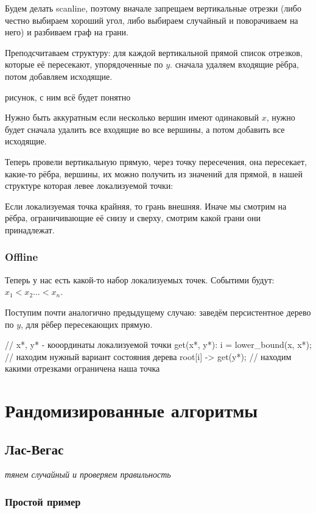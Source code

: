 Будем делать scanline, поэтому вначале запрещаем вертикальные 
отрезки (либо честно выбираем хороший угол, либо выбираем случайный 
и поворачиваем на него) и разбиваем граф на грани.

Преподсчитаваем структуру: для каждой вертикальной прямой список отрезков, которые
её пересекают, упорядоченные по $y$.  сначала удаляем входящие рёбра, потом добавляем
исходящие.

\TODO рисунок, с ним всё будет понятно

Нужно быть аккуратным если несколько вершин имеют одинаковый $x$, нужно будет
сначала удалить все входящие во все вершины, а потом добавить все исходящие.

Теперь провели вертикальную прямую, через точку пересечения, она пересекает,
какие-то рёбра, вершины, их можно получить из значений для прямой,
в нашей структуре которая левее локализуемой точки:

Если локализуемая точка крайняя, то грань внешняя. Иначе мы смотрим на рёбра, 
ограничивающие её снизу и сверху, смотрим какой грани они принадлежат.

\subsection{Offline}

Теперь у нас есть какой-то набор локализуемых точек.
Событими будут: $x_1 < x_2 \ldots < x_n$.

Поступим почти аналогично предыдущему случаю: заведём персистентное дерево по $y$,
для рёбер пересекающих прямую.

\begin{cppcode}
    // x*, y* - кооординаты локализуемой точки
    get(x*, y*):
        i = lower\_bound(x, x*); // находим нужный вариант состояния дерева
        root[i] -> get(y*);      // находим какими отрезками ограничена наша точка
\end{cppcode}


\chapter{Рандомизированные алгоритмы}

\section{Лас-Вегас}

\textit{тянем случайный и проверяем правильность}

\subsection{Простой пример}

